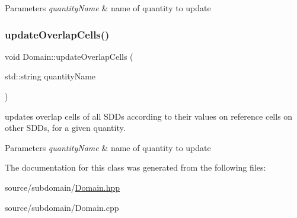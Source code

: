 \begin{DoxyParams}{Parameters}
{\em quantity\+Name} & name of quantity to update \\
\hline
\end{DoxyParams}
\mbox{\label{classDomain_abcd8aa2529907b8022e41e45c85f5144}} 
\subsubsection{\texorpdfstring{update\+Overlap\+Cells()}{updateOverlapCells()}\hspace{0.1cm}{\footnotesize\ttfamily [2/2]}}
{\footnotesize\ttfamily void Domain\+::update\+Overlap\+Cells (\begin{DoxyParamCaption}\item[{std\+::string}]{quantity\+Name }\end{DoxyParamCaption})}



updates overlap cells of all S\+D\+Ds according to their values on reference cells on other S\+D\+Ds, for a given quantity. 


\begin{DoxyParams}{Parameters}
{\em quantity\+Name} & name of quantity to update \\
\hline
\end{DoxyParams}


The documentation for this class was generated from the following files\+:\begin{DoxyCompactItemize}
\item 
source/subdomain/\hyperlink{source_2subdomain_2Domain_8hpp}{Domain.\+hpp}\item 
source/subdomain/Domain.\+cpp\end{DoxyCompactItemize}
